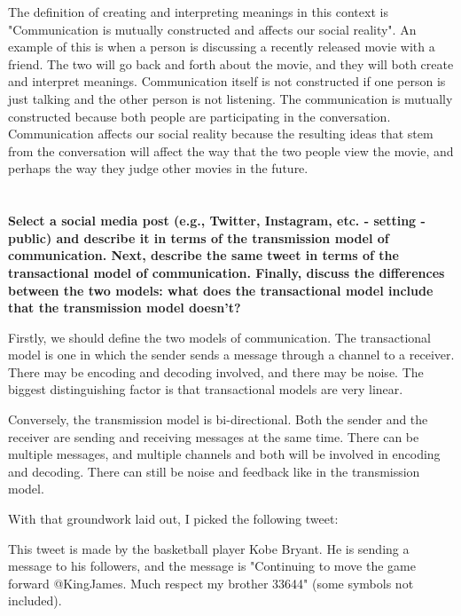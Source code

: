 \documentclass[a4paper]{article}
\begin{document}
        The definition of creating and interpreting meanings in this context is "Communication is mutually constructed and affects our 
        social reality". An example of this is when a person is discussing a recently released movie with a friend. The two will 
        go back and forth about the movie, and they will both create and interpret meanings. Communication itself is not 
        constructed if one person is just talking and the other person is not listening. The communication is mutually constructed
        because both people are participating in the conversation. Communication affects our social reality because the
        resulting ideas that stem from the conversation will affect the way that the two people view the movie, and 
        perhaps the way they judge other movies in the future.

  
    \section{}
        \textbf{Select a social media post (e.g., Twitter, Instagram, etc. - setting - public) and describe it in terms of the transmission model of communication. Next, describe the same tweet in terms of the transactional model of communication. Finally, discuss the differences between the two models: what does the transactional model include that the transmission model doesn’t?}

        Firstly, we should define the two models of communication. The transactional model is one in which the sender sends a message
        through a channel to a receiver. There may be encoding and decoding involved, and there may be noise. The biggest 
        distinguishing factor is that transactional models are very linear. 

        Conversely, the transmission model is bi-directional. Both the sender and the receiver are sending and receiving messages
        at the same time. There can be multiple messages, and multiple channels and both will be involved in encoding and decoding.
        There can still be noise and feedback like in the transmission model. 

        With that groundwork laid out, I picked the following tweet: \citep{kobeTweet}

        This tweet is made by the basketball player Kobe Bryant. He is sending a message to his followers, and the message is
        "Continuing to move the game forward @KingJames. Much respect my brother 33644" (some symbols not included). 
        
\end{document}
